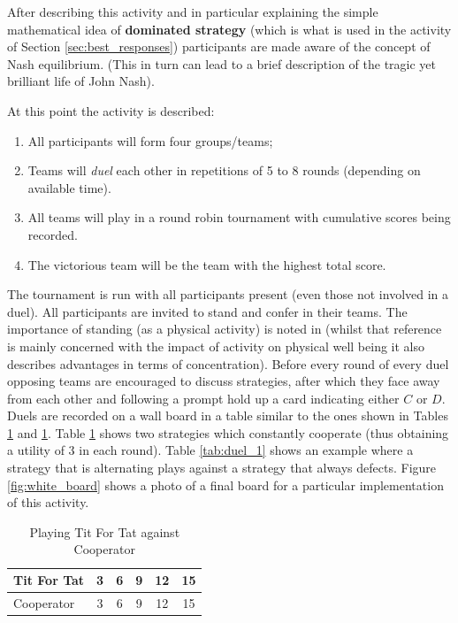 \documentclass[12pt, a4paper]{article}
\begin{document}
After describing this activity and in particular explaining the simple
mathematical idea of \textbf{dominated strategy} (which is what is used in the
activity of Section \ref{sec:best_responses}) participants are made aware of the
concept of Nash equilibrium. (This in turn can lead to a brief description of the
tragic yet brilliant life of John Nash).

At this point the activity is described:

\begin{enumerate}
    \item All participants will form four groups/teams;
    \item Teams will \textit{duel} each other in repetitions of 5 to 8 rounds
        (depending on available time).
    \item All teams will play in a round robin tournament with cumulative scores
        being recorded.
    \item The victorious team will be the team with the highest total score.
\end{enumerate}

The tournament is run with all participants present (even those not involved in
a duel).  All participants are invited to stand and confer in their teams. The
importance of standing (as a physical activity) is noted in \cite{Donnelly2011}
(whilst that reference is mainly concerned with the impact of activity on
physical well being it also describes advantages in terms of concentration).
Before every round of every duel opposing teams are encouraged to discuss
strategies, after which they face away from each other and following a prompt
hold up a card indicating either \(C\) or \(D\).  Duels are recorded on a wall
board in a table similar to the ones shown in Tables \ref{tab:duel} and
\ref{tab:duel}.  Table \ref{tab:duel} shows two strategies which constantly
cooperate (thus obtaining a utility of 3 in each round). Table \ref{tab:duel_1}
shows an example where a strategy that is alternating plays against a strategy
that always defects.  Figure \ref{fig:white_board} shows a photo of a final
board for a particular implementation of this activity.

\begin{table}[!htbp]
    \caption{Playing Tit For Tat against Cooperator}
    \centering
    \begin{tabular}{lccccc}
        \toprule
        Tit For Tat&3&6&9&12&15\\
        \midrule
        Cooperator&3&6&9&12&15\\
        \bottomrule
    \end{tabular}
    \label{tab:duel}
\end{table}
\end{document}
